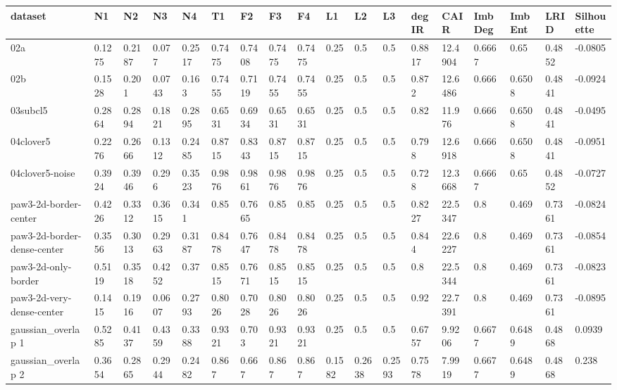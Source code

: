 \begin{landscape}
\begin{table}[tbp]
    \centering
    \begin{tabular}{|l|l|l|l|l|l|l|l|l|l|l|l|l|l|l|l|l|l|}
    \hline
        dataset & N1 & N2 & N3 & N4 & T1 & F2 & F3 & F4 & L1 & L2 & L3 & degIR & CAIR & ImbDeg & ImbEnt & LRID & Silhouette \\ \hline
        02a & 0.1275 & 0.2187 & 0.077 & 0.2517 & 0.7475 & 0.7408 & 0.7475 & 0.7475 & 0.25 & 0.5 & 0.5 & 0.8817 & 12.4904 & 0.6667 & 0.65 & 0.4852 & -0.0805 \\ \hline
        02b & 0.1528 & 0.201 & 0.0743 & 0.163 & 0.7455 & 0.7119 & 0.7455 & 0.7455 & 0.25 & 0.5 & 0.5 & 0.872 & 12.6486 & 0.666 & 0.6508 & 0.4841 & -0.0924 \\ \hline
        03subcl5 & 0.2864 & 0.2894 & 0.1821 & 0.2895 & 0.6531 & 0.6934 & 0.6531 & 0.6531 & 0.25 & 0.5 & 0.5 & 0.82 & 11.976 & 0.666 & 0.6508 & 0.4841 & -0.0495 \\ \hline
        04clover5 & 0.2276 & 0.2666 & 0.1312 & 0.2485 & 0.8715 & 0.8343 & 0.8715 & 0.8715 & 0.25 & 0.5 & 0.5 & 0.798 & 12.6918 & 0.666 & 0.6508 & 0.4841 & -0.0951 \\ \hline
        04clover5-noise & 0.3924 & 0.3946 & 0.296 & 0.3523 & 0.9876 & 0.9861 & 0.9876 & 0.9876 & 0.25 & 0.5 & 0.5 & 0.728 & 12.3668 & 0.6667 & 0.65 & 0.4852 & -0.0727 \\ \hline
        paw3-2d-border-center & 0.4226 & 0.3312 & 0.3615 & 0.341 & 0.85 & 0.7665 & 0.85 & 0.85 & 0.25 & 0.5 & 0.5 & 0.8227 & 22.5347 & 0.8 & 0.469 & 0.7361 & -0.0824 \\ \hline
        paw3-2d-border-dense-center & 0.3556 & 0.3013 & 0.2963 & 0.3187 & 0.8478 & 0.7647 & 0.8478 & 0.8478 & 0.25 & 0.5 & 0.5 & 0.844 & 22.6227 & 0.8 & 0.469 & 0.7361 & -0.0854 \\ \hline
        paw3-2d-only-border & 0.5119 & 0.3518 & 0.4252 & 0.37 & 0.8515 & 0.7671 & 0.8515 & 0.8515 & 0.25 & 0.5 & 0.5 & 0.8 & 22.5344 & 0.8 & 0.469 & 0.7361 & -0.0823 \\ \hline
        paw3-2d-very-dense-center & 0.1415 & 0.1916 & 0.0607 & 0.2793 & 0.8026 & 0.7028 & 0.8026 & 0.8026 & 0.25 & 0.5 & 0.5 & 0.92 & 22.7391 & 0.8 & 0.469 & 0.7361 & -0.0895 \\ \hline
        gaussian\_overlap 1 & 0.5285 & 0.4137 & 0.4359 & 0.3388 & 0.9321 & 0.703 & 0.9321 & 0.9321 & 0.25 & 0.5 & 0.5 & 0.6757 & 9.9206 & 0.6677 & 0.6489 & 0.4868 & 0.0939 \\ \hline
        gaussian\_overlap 2 & 0.3654 & 0.2865 & 0.2944 & 0.2482 & 0.867 & 0.667 & 0.867 & 0.867 & 0.1582 & 0.2638 & 0.2593 & 0.7578 & 7.9919 & 0.6677 & 0.6489 & 0.4868 & 0.238 \\ \hline

\end{tabular}
\end{table}
\end{landscape}
